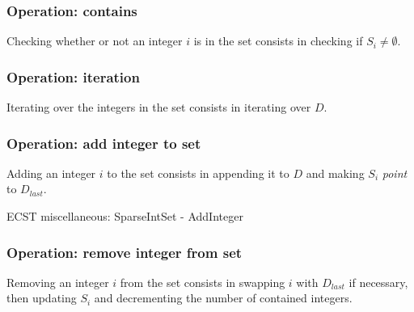 \documentclass[twoside, 12pt, a4paper, openright]{book}
\begin{document}
\subsubsection{Operation: contains}\label{operation-contains}

Checking whether or not an integer \(i\) is in the set consists in
checking if \(S_i \neq \emptyset\).

\subsubsection{Operation: iteration}\label{operation-iteration}

Iterating over the integers in the set consists in iterating over \(D\).

\subsubsection{Operation: add integer to
set}\label{operation-add-integer-to-set}

Adding an integer \(i\) to the set consists in appending it to \(D\) and
making \(S_i\) \emph{point} to \(D_{last}\).

\begin{algorithm}[H]

\caption{ECST miscellaneous: SparseIntSet - AddInteger}
\footnotesize



\end{algorithm}

\subsubsection{Operation: remove integer from
set}\label{operation-remove-integer-from-set}

Removing an integer \(i\) from the set consists in swapping \(i\) with
\(D_{last}\) if necessary, then updating \(S_i\) and decrementing the
number of contained integers.
\end{document}
